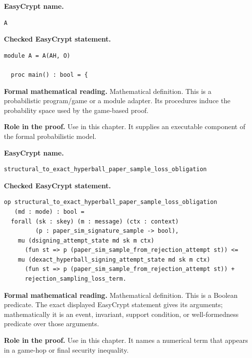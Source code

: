 \begin{formaldefinition}
\noindent\textbf{EasyCrypt name.}
\begin{lstlisting}[language=EasyCrypt,basicstyle=\ttfamily\scriptsize]
A
\end{lstlisting}
\noindent\textbf{Checked EasyCrypt statement.}
\begin{lstlisting}[language=EasyCrypt,basicstyle=\ttfamily\scriptsize]
module A = A(AH, O)

  proc main() : bool = {
\end{lstlisting}
\noindent\textbf{Formal mathematical reading.}
Mathematical definition. This is a probabilistic program/game or a module adapter.  Its procedures induce the probability space used by the game-based proof.

\noindent\textbf{Role in the proof.}
Use in this chapter. It supplies an executable component of the formal probabilistic model.

\end{formaldefinition}

\begin{formaldefinition}
\noindent\textbf{EasyCrypt name.}
\begin{lstlisting}[language=EasyCrypt,basicstyle=\ttfamily\scriptsize]
structural_to_exact_hyperball_paper_sample_loss_obligation
\end{lstlisting}
\noindent\textbf{Checked EasyCrypt statement.}
\begin{lstlisting}[language=EasyCrypt,basicstyle=\ttfamily\scriptsize]
op structural_to_exact_hyperball_paper_sample_loss_obligation
   (md : mode) : bool =
  forall (sk : skey) (m : message) (ctx : context)
         (p : paper_sim_signature_sample -> bool),
    mu (dsigning_attempt_state md sk m ctx)
      (fun st => p (paper_sim_sample_from_rejection_attempt st)) <=
    mu (dexact_hyperball_signing_attempt_state md sk m ctx)
      (fun st => p (paper_sim_sample_from_rejection_attempt st)) +
      rejection_sampling_loss_term.
\end{lstlisting}
\noindent\textbf{Formal mathematical reading.}
Mathematical definition. This is a Boolean predicate.  The exact displayed EasyCrypt statement gives its arguments; mathematically it is an event, invariant, support condition, or well-formedness predicate over those arguments.

\noindent\textbf{Role in the proof.}
Use in this chapter. It names a numerical term that appears in a game-hop or final security inequality.

\end{formaldefinition}

